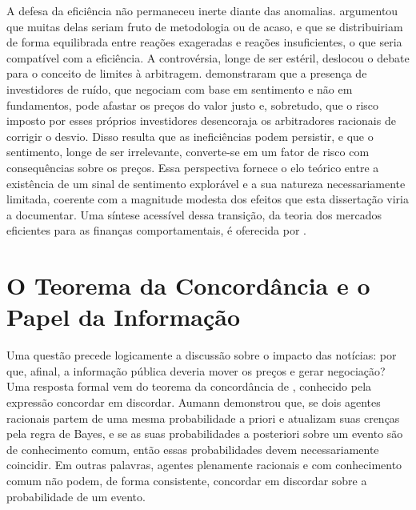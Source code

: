 A defesa da eficiência não permaneceu inerte diante das anomalias.  argumentou que muitas delas seriam fruto de metodologia ou de acaso, e que se distribuiriam de forma equilibrada entre reações exageradas e reações insuficientes, o que seria compatível com a eficiência. A controvérsia, longe de ser estéril, deslocou o debate para o conceito de limites à arbitragem.  demonstraram que a presença de investidores de ruído, que negociam com base em sentimento e não em fundamentos, pode afastar os preços do valor justo e, sobretudo, que o risco imposto por esses próprios investidores desencoraja os arbitradores racionais de corrigir o desvio. Disso resulta que as ineficiências podem persistir, e que o sentimento, longe de ser irrelevante, converte-se em um fator de risco com consequências sobre os preços. Essa perspectiva fornece o elo teórico entre a existência de um sinal de sentimento explorável e a sua natureza necessariamente limitada, coerente com a magnitude modesta dos efeitos que esta dissertação viria a documentar. Uma síntese acessível dessa transição, da teoria dos mercados eficientes para as finanças comportamentais, é oferecida por .

\section{O Teorema da Concordância e o Papel da Informação}

Uma questão precede logicamente a discussão sobre o impacto das notícias: por que, afinal, a informação pública deveria mover os preços e gerar negociação? Uma resposta formal vem do teorema da concordância de , conhecido pela expressão concordar em discordar. Aumann demonstrou que, se dois agentes racionais partem de uma mesma probabilidade a priori e atualizam suas crenças pela regra de Bayes, e se as suas probabilidades a posteriori sobre um evento são de conhecimento comum, então essas probabilidades devem necessariamente coincidir. Em outras palavras, agentes plenamente racionais e com conhecimento comum não podem, de forma consistente, concordar em discordar sobre a probabilidade de um evento.

